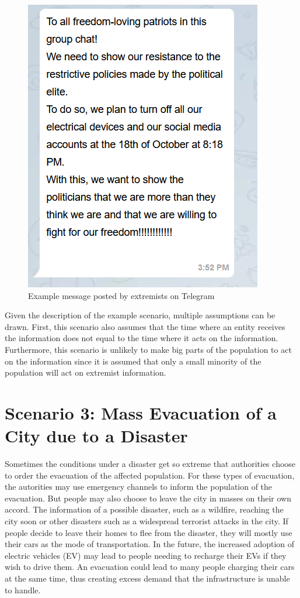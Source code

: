 \begin{figure}[!ht]
    \center
    \includegraphics[scale=.7]{figs/schwurblerchat.png}
    \caption{Example message posted by extremists on Telegram}
    \label{schwurbler}
\end{figure}

Given the description of the example scenario, multiple assumptions can be drawn.
First, this scenario also assumes that the time where an entity receives the
information does not equal to the time where it acts on the information.
Furthermore, this scenario is unlikely to make big parts of the population
to act on the information since it is assumed that only a small minority
of the population will act on extremist information.

\section{Scenario 3: Mass Evacuation of a City due to a Disaster}

Sometimes the conditions under a disaster get so extreme that 
authorities choose to order the evacuation of the affected population.
For these types of evacuation, the autorities may use emergency channels 
to inform the population of the evacuation.
But people may also choose to leave the city in masses on their own accord.
The information of a possible disaster, such as a wildfire, reaching the
city soon or other disasters such as a widespread terrorist attacks 
in the city.
If people decide to leave their homes to flee from the disaster, they 
will mostly use their cars as the mode of transportation.
In the future, the increased adoption of electric vehicles (EV)
may lead to people needing to recharge their EVs if they wish 
to drive them. An evacuation could lead to many people charging
their cars at the same time, thus creating excess demand that 
the infrastructure is unable to handle. 

